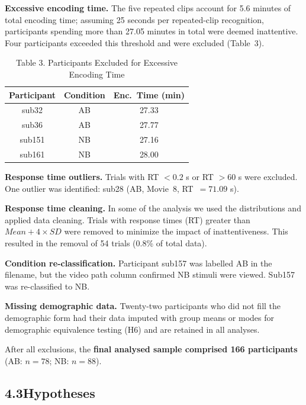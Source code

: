 \documentclass[11pt]{article}
\begin{document}
\textbf{Excessive encoding time.}\; The five repeated clips account for 5.6 minutes of total encoding time; assuming 25 seconds per repeated-clip recognition, participants spending more than 27.05 minutes in total were deemed inattentive. Four participants exceeded this threshold and were excluded (Table~3).

\begin{table}[H]
\centering
\small
\caption*{Table 3.\; Participants Excluded for Excessive Encoding Time}
\begin{tabular}{@{} c c c @{}}
\toprule
\textbf{Participant} & \textbf{Condition} & \textbf{Enc.\ Time (min)} \\
\midrule
sub32  & AB & 27.33 \\
sub36  & AB & 27.77 \\
sub151 & NB & 27.16 \\
sub161 & NB & 28.00 \\
\bottomrule
\end{tabular}
\end{table}

\textbf{Response time outliers.}\; Trials with RT $< 0.2$ s or RT $> 60$ s were excluded. One outlier was identified: sub28 (AB, Movie~8, RT~$= 71.09$ s).

\textbf{Response time cleaning.} In some of the analysis we used the distributions and applied data cleaning. Trials with response times (RT) greater than $Mean + 4 \times SD$  were removed to minimize the impact of inattentiveness. This resulted in the removal of 54 trials (0.8\% of total data).

\textbf{Condition re-classification.}\; Participant sub157 was labelled AB in the filename, but the video path column confirmed NB stimuli were viewed. Sub157 was re-classified to NB.

\textbf{Missing demographic data.}\; Twenty-two participants who did not fill the demographic form had their data imputed with group means or modes for demographic equivalence testing (H6) and are retained in all analyses.

After all exclusions, the \textbf{final analysed sample comprised 166 participants} (AB: $n = 78$; NB: $n = 88$).

\subsection*{4.3\quad Hypotheses}
\end{document}
